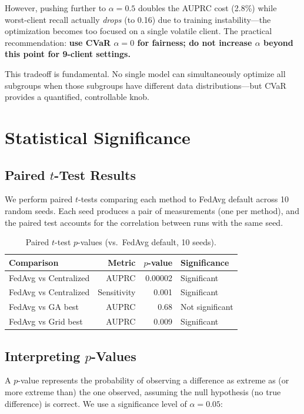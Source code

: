 \documentclass[11pt,a4paper]{report}
\begin{document}
However, pushing further to $\alpha = 0.5$ doubles the AUPRC cost (2.8\%) while worst-client recall actually \emph{drops} (to 0.16) due to training instability---the optimization becomes too focused on a single volatile client. The practical recommendation: \textbf{use CVaR $\alpha = 0$ for fairness; do not increase $\alpha$ beyond this point for 9-client settings.}

This tradeoff is fundamental. No single model can simultaneously optimize all subgroups when those subgroups have different data distributions---but CVaR provides a quantified, controllable knob.


\chapter{Statistical Significance}
\label{ch:stats}

\section{Paired $t$-Test Results}

We perform paired $t$-tests comparing each method to FedAvg default across 10 random seeds. Each seed produces a pair of measurements (one per method), and the paired test accounts for the correlation between runs with the same seed.

\begin{table}[H]
\centering
\caption{Paired $t$-test $p$-values (vs.\ FedAvg default, 10 seeds).}
\label{tab:pvalues}
\begin{tabular}{lrrl}
\toprule
\textbf{Comparison} & \textbf{Metric} & \textbf{$p$-value} & \textbf{Significance} \\
\midrule
FedAvg vs Centralized & AUPRC & 0.00002 & Significant \\
FedAvg vs Centralized & Sensitivity & 0.001 & Significant \\
FedAvg vs GA best & AUPRC & 0.68 & Not significant \\
FedAvg vs Grid best & AUPRC & 0.009 & Significant \\
\bottomrule
\end{tabular}
\end{table}

\section{Interpreting $p$-Values}

A $p$-value represents the probability of observing a difference as extreme as (or more extreme than) the one observed, assuming the null hypothesis (no true difference) is correct. We use a significance level of $\alpha = 0.05$:
\end{document}

